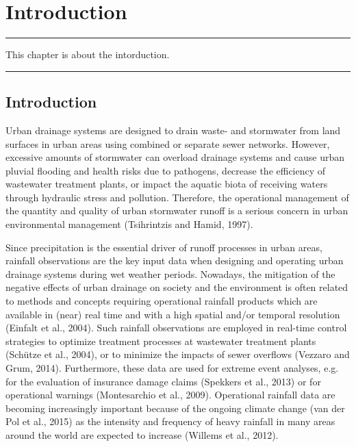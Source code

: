 \documentclass{ctuthesis}\usepackage[]{graphicx}\usepackage[]{color}
\begin{document}
        \maketitle
        
        


\chapter{Introduction} \label{chap1}

\rule{\textwidth}{0.4pt}
This chapter is about the intorduction. \newline
\rule[0.2cm]{\textwidth}{0.4pt}


\section{Introduction}

Urban drainage systems are designed to drain waste- and stormwater from land surfaces in urban areas using combined or separate sewer networks. However, excessive amounts of stormwater can overload drainage systems and cause urban pluvial flooding and health risks due to pathogens, decrease the efficiency of wastewater treatment plants, or impact the aquatic biota of receiving waters through hydraulic stress and pollution. Therefore, the operational management of the quantity and quality of urban stormwater runoff is a serious concern in urban environmental management (Tsihrintzis and Hamid, 1997).

Since precipitation is the essential driver of runoff processes in urban areas, rainfall observations are the key input data when designing and operating urban drainage systems during wet weather periods. Nowadays, the mitigation of the negative effects of urban drainage on society and the environment is often related to methods and concepts requiring operational rainfall products which are available in (near) real time and with a high spatial and/or temporal resolution (Einfalt et al., 2004). Such rainfall observations are employed in real-time control strategies to optimize treatment processes at wastewater treatment plants (Schütze et al., 2004), or to minimize the impacts of sewer overflows (Vezzaro and Grum, 2014). Furthermore, these data are used for extreme event analyses, e.g. for the evaluation of insurance damage claims (Spekkers et al., 2013) or for operational warnings (Montesarchio et al., 2009). Operational rainfall data are becoming increasingly important because of the ongoing climate change (van der Pol et al., 2015) as the intensity and frequency of heavy rainfall in many areas around the world are expected to increase (Willems et al., 2012).
\end{document}
